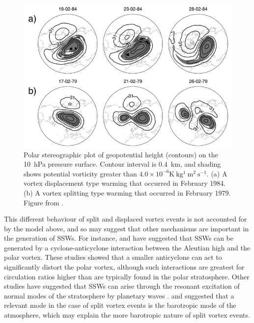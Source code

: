 \begin{figure}
 \centering
 \noindent\includegraphics[width=\textwidth]{figures/chapter-intro/charlton_polvani_SSW.png}
 \caption[Examples of a split and displaced vortex event from
 \citet{Charlton2007a}]{Polar stereographic plot of geopotential height
   (contours) on the 10~hPa pressure surface. Contour interval is 0.4~km, and
   shading shows potential vorticity greater than
   $4.0 \times 10^{-6} \mathrm{K~kg^1~m^2~s^{-1}}$. (a) A vortex displacement
   type warming that occurred in February 1984. (b) A vortex splitting type
   warming that occurred in February 1979. Figure from \citet{Charlton2007}.}
 \label{fig:charlton_polvani_ssw}
\end{figure}

This different behaviour of split and displaced vortex events is not accounted
for by the \citet{Matsuno1970, Matsuno1971} model above, and so may suggest that
other mechanisms are important in the generation of SSWs. For instance,
\citet{ONeill1988} and \citet{Scott2006} have suggested that SSWs can be
generated by a cyclone-anticyclone interaction between the Aleutian high and the
polar vortex. These studies showed that a smaller anticyclone can act to
significantly distort the polar vortex, although such interactions are greatest
for circulation ratios higher than are typically found in the polar
stratosphere. Other studies have suggested that SSWs can arise through the
resonant excitation of normal modes of the stratosphere by planetary waves
\citep{Tung1979, Plumb1981, Smith1989}. \citet{Esler2005} and \citet{Esler2006}
suggested that a relevant mode in the case of split vortex events is the
barotropic mode of the atmosphere, which may explain the more barotropic nature
of split vortex events.

